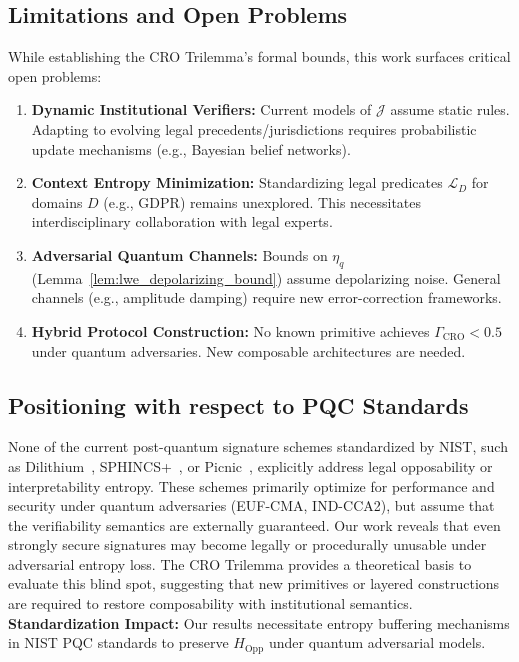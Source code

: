 \documentclass[preprint,12pt]{elsarticle}
\begin{document}
        \subsection{Limitations and Open Problems}\label{subsec:open_problems}
            While establishing the CRO Trilemma's formal bounds, this work surfaces critical open problems:
            \begin{enumerate}
                \item \textbf{Dynamic Institutional Verifiers:} Current models of $\mathcal{J}$ assume static rules. Adapting to evolving legal precedents/jurisdictions requires probabilistic update mechanisms (e.g., Bayesian belief networks).
                \item \textbf{Context Entropy Minimization:} Standardizing legal predicates $\mathcal{L}_D$ for domains $D$ (e.g., GDPR) remains unexplored. This necessitates interdisciplinary collaboration with legal experts.
                \item \textbf{Adversarial Quantum Channels:} Bounds on $\eta_q$ (Lemma~\ref{lem:lwe_depolarizing_bound}) assume depolarizing noise. General channels (e.g., amplitude damping) require new error-correction frameworks.
                \item \textbf{Hybrid Protocol Construction:} No known primitive achieves $\Gamma_{\text{CRO}} < 0.5$ under quantum adversaries. New composable architectures are needed.
            \end{enumerate}
        \subsection{Positioning with respect to PQC Standards}\label{subsec:positioning}
            None of the current post-quantum signature schemes standardized by NIST, such as Dilithium~\cite{dilithium2020spec}, SPHINCS+~\cite{sphincs2023submission}, or Picnic~\cite{picnic2022submission}, explicitly address legal opposability or interpretability entropy. These schemes primarily optimize for performance and security under quantum adversaries (EUF-CMA, IND-CCA2), but assume that the verifiability semantics are externally guaranteed. Our work reveals that even strongly secure signatures may become legally or procedurally unusable under adversarial entropy loss. The CRO Trilemma provides a theoretical basis to evaluate this blind spot, suggesting that new primitives or layered constructions are required to restore composability with institutional semantics.
            \textbf{Standardization Impact:} Our results necessitate entropy buffering mechanisms in NIST PQC standards to preserve $H_{\text{Opp}}$ under quantum adversarial models.
\end{document}
